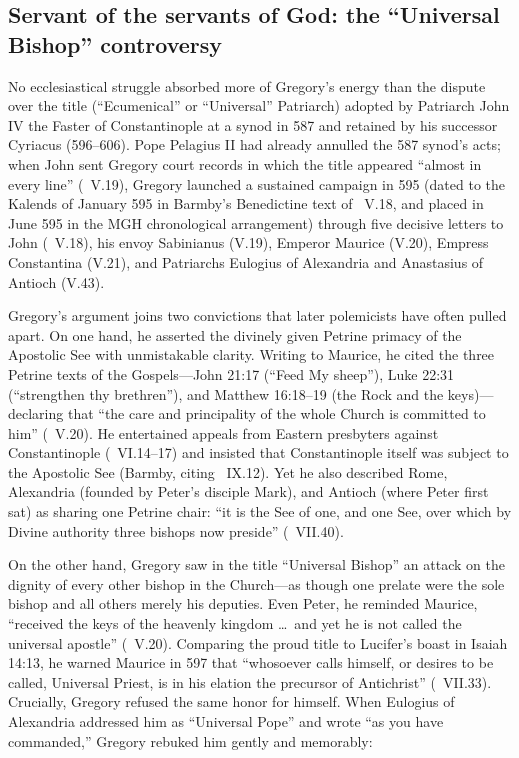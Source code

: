 \subsection{Servant of the servants of God: the ``Universal Bishop'' controversy}

No ecclesiastical struggle absorbed more of Gregory's energy than the dispute
over the title  (``Ecumenical'' or ``Universal''
Patriarch) adopted by Patriarch John IV the Faster of Constantinople at a synod
in 587 and retained by his successor Cyriacus (596--606). Pope Pelagius II had
already annulled the 587 synod's acts; when John sent Gregory court records in
which the title appeared ``almost in every line'' (\ V.19), Gregory
launched a sustained campaign in 595 (dated to the Kalends of January 595 in
Barmby's Benedictine text of \ V.18, and placed in June 595 in the
MGH chronological arrangement) through five decisive letters to John
(\ V.18), his envoy Sabinianus (V.19), Emperor Maurice (V.20),
Empress Constantina (V.21), and Patriarchs Eulogius of Alexandria and
Anastasius of Antioch (V.43).

Gregory's argument joins two convictions that later polemicists have often
pulled apart. On one hand, he asserted the divinely given Petrine primacy of
the Apostolic See with unmistakable clarity. Writing to Maurice, he cited the
three Petrine texts of the Gospels---John 21:17 (``Feed My sheep''), Luke 22:31
(``strengthen thy brethren''), and Matthew 16:18--19 (the Rock and the
keys)---declaring that ``the care and principality of the whole Church is
committed to him'' (\ V.20). He entertained appeals from Eastern
presbyters against Constantinople (\ VI.14--17) and insisted that
Constantinople itself was subject to the Apostolic See (Barmby, citing
\ IX.12). Yet he also described Rome, Alexandria (founded by Peter's
disciple Mark), and Antioch (where Peter first sat) as sharing one Petrine
chair: ``it is the See of one, and one See, over which by Divine authority
three bishops now preside'' (\ VII.40).

On the other hand, Gregory saw in the title ``Universal Bishop'' an attack on
the dignity of every other bishop in the Church---as though one prelate were
the sole bishop and all others merely his deputies. Even Peter, he reminded
Maurice, ``received the keys of the heavenly kingdom \dots\ and yet he is not
called the universal apostle'' (\ V.20). Comparing the proud title to
Lucifer's boast in Isaiah 14:13, he warned Maurice in 597 that ``whosoever
calls himself, or desires to be called, Universal Priest, is in his elation the
precursor of Antichrist'' (\ VII.33). Crucially, Gregory refused the
same honor for himself. When Eulogius of Alexandria addressed him as
``Universal Pope'' and wrote ``as you have commanded,'' Gregory rebuked him
gently and memorably:

